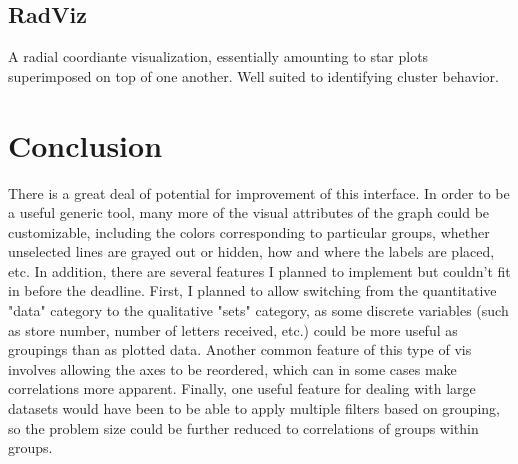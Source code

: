 \documentclass[]{article}
\begin{document}
	\subsection{RadViz}
	A radial coordiante visualization, essentially amounting to star plots superimposed on top of one another. Well suited to identifying cluster behavior. \cite{rad}
	
\section{Conclusion}
	There is a great deal of potential for improvement of this interface. In order to be a useful generic tool, many more of the visual attributes of the graph could be customizable, including the colors corresponding to particular groups, whether unselected lines are grayed out or hidden, how and where the labels are placed, etc. In addition, there are several features I planned to implement but couldn't fit in before the deadline. First, I planned to allow switching from the quantitative "data" category to the qualitative "sets" category, as some discrete variables (such as store number, number of letters received, etc.) could be more useful as groupings than as plotted data. Another common feature of this type of vis involves allowing the axes to be reordered, which can in some cases make correlations more apparent. Finally, one useful feature for dealing with large datasets would have been to be able to apply multiple filters based on grouping, so the problem size could be further reduced to correlations of groups within groups.

\vfill
\end{document}
